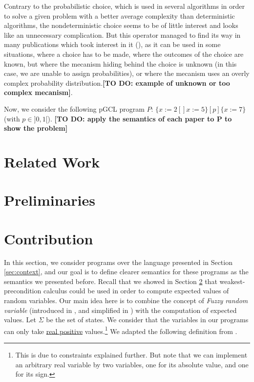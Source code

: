 \documentclass[a4paper,10pt]{llncs}
\newcommand\todo[1]{{\color{red}\textbf{[TO DO:  #1]}}}
\begin{document}
{Contrary to the probabilistic choice, which is used in several algorithms in order to solve a given problem with a better average complexity than deterministic algorithms, the nondeterministic choice seems to be of little interest and looks like an unnecessary complication. But this operator managed to find its way in many publications which took interest in it (\cite{WuChen08,WuChen11,WuChen12,McIver05}), as it can be used in some situations, where a choice has to be made, where the outcomes of the choice are known, but where the mecanism hiding behind the choice is unknown (in this case, we are unable to assign probabilities), or where the mecanism uses an overly complex probability distribution.\todo{example of unknown or too complex mecanism}.\newline

Now, we consider the following pGCL program $P$: $\{ x := 2 [\!] x := 5 \} [p] \{ x := 7 \}$ (with $p \in ]0,1[$). \todo{apply the semantics of each paper to P to show the problem}
}
\section{Related Work}
\label{sec:related}

\section{Preliminaries}
\label{sec:preliminaries}

\section{Contribution}
\label{sec:contribution}

In this section, we consider programs over the language presented in Section \ref{sec:context}, and our goal is to define clearer semantics for these programs as the semantics we presented before. Recall that we showed in Section \ref{sec:preliminaries} that weakest-precondition calculus could be used in order to compute expected values of random variables. Our main idea here is to combine the concept of \textit{Fuzzy random variable} (introduced in \cite{PuriRal86}, and simplified in \cite{Shapiro09}) with the computation of expected values.\newline
Let $\Sigma$ be the set of states. We consider that the variables in our programs can only take \underline{real positive} values.\footnote{This is due to constraints explained further. But note that we can implement an arbitrary real variable by two variables, one for its absolute value, and one for its sign.} We adapted the following definition from \cite{PuriRal86}.
\end{document}
